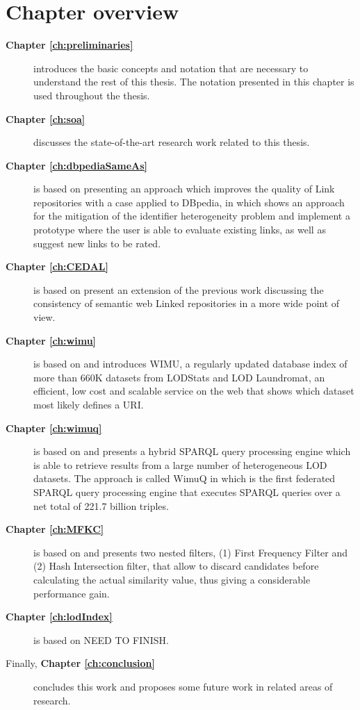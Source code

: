 \section{Chapter overview}
\begin{description}
    \item[\textbf{Chapter \ref{ch:preliminaries}}] introduces the basic concepts and notation that are necessary to understand the rest of this thesis. The notation presented in this chapter is used throughout the thesis.
    \item[\textbf{Chapter \ref{ch:soa}}] discusses the state-of-the-art research work related to this thesis.
    \item[\textbf{Chapter \ref{ch:dbpediaSameAs}}] is based on \cite{valdestilhasdbpediasameas} presenting an approach which improves the quality of Link repositories with a case applied to DBpedia, in which shows an approach for the mitigation of the identifier heterogeneity problem and implement a prototype where the user is able to evaluate existing links, as well as suggest new links to be rated.
    \item[\textbf{Chapter \ref{ch:CEDAL}}] is based on \cite{valdestilhas2017cedal} present an extension of the previous work \cite{valdestilhasdbpediasameas} discussing the consistency of semantic web Linked repositories in a more wide point of view.
    \item[\textbf{Chapter \ref{ch:wimu}}] is based on \cite{valdestilhas2018my} and introduces WIMU, a regularly updated database index of more than 660K datasets from LODStats and LOD Laundromat, an efficient, low cost and scalable service on the web that shows which dataset most likely defines a URI.
    \item[\textbf{Chapter \ref{ch:wimuq}}] is based on \cite{ValdestilhasKcap} and presents a hybrid SPARQL query processing engine which is able to retrieve results from a large number of heterogeneous LOD datasets. The approach is called WimuQ in which is the first federated SPARQL query processing engine that executes SPARQL queries over a net total of 221.7 billion triples.
    \item[\textbf{Chapter \ref{ch:MFKC}}] is based on \cite{valdestilhas2017high} and presents two nested filters, (1) First Frequency Filter and (2) Hash Intersection filter, that allow to discard candidates before calculating the actual similarity value, thus giving a considerable performance gain.
    \item[\textbf{Chapter \ref{ch:lodIndex}}] is based on \cite{} NEED TO FINISH.
    \item[Finally, \textbf{Chapter \ref{ch:conclusion}}] concludes this work and proposes some future work in related areas of research.
\end{description}
